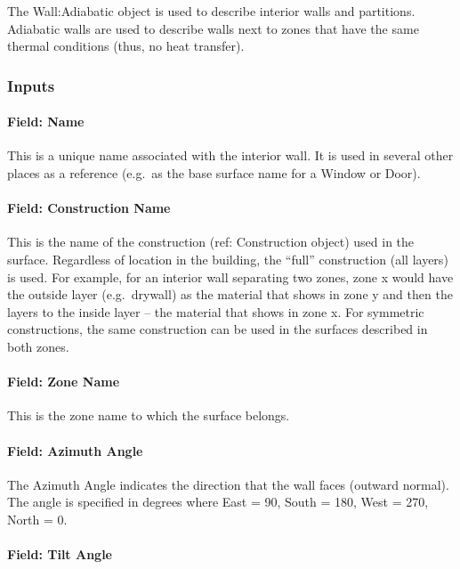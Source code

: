 The Wall:Adiabatic object is used to describe interior walls and partitions. Adiabatic walls are used to describe walls next to zones that have the same thermal conditions (thus, no heat transfer).

\subsubsection{Inputs}\label{inputs-5-032}

\paragraph{Field: Name}\label{field-name-1-044}

This is a unique name associated with the interior wall. It is used in several other places as a reference (e.g.~as the base surface name for a Window or Door).

\paragraph{Field: Construction Name}\label{field-construction-name-1-001}

This is the name of the construction (ref: Construction object) used in the surface. Regardless of location in the building, the ``full'' construction (all layers) is used. For example, for an interior wall separating two zones, zone x would have the outside layer (e.g.~drywall) as the material that shows in zone y and then the layers to the inside layer -- the material that shows in zone x. For symmetric constructions, the same construction can be used in the surfaces described in both zones.

\paragraph{Field: Zone Name}\label{field-zone-name-1-009}

This is the zone name to which the surface belongs.

\paragraph{Field: Azimuth Angle}\label{field-azimuth-angle-1}

The Azimuth Angle indicates the direction that the wall faces (outward normal). The angle is specified in degrees where East = 90, South = 180, West = 270, North = 0.

\paragraph{Field: Tilt Angle}\label{field-tilt-angle-1}

